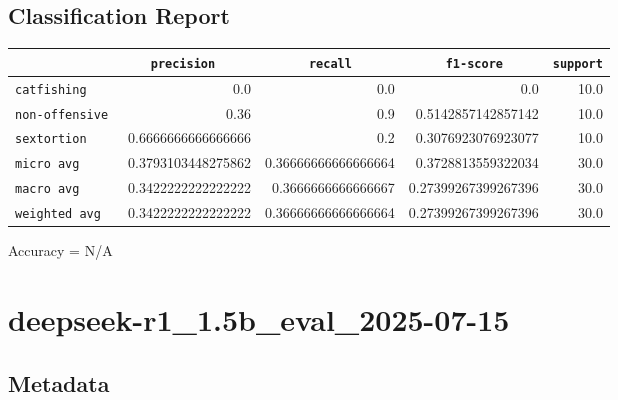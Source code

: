 \documentclass{article}
\begin{document}
\subsection{Classification Report}

\begin{center}
\begin{tabular}{l | r | r | r | r} \hline
    \verb|            | & \verb|    precision     | & \verb|      recall      | & \verb|     f1-score     | & \verb|support| \\ \hline
    \hline
    \verb|catfishing | & 0.0 & 0.0 & 0.0 &    10.0 \\ \hline
    \verb|non-offensive| & 0.36 & 0.9 & 0.5142857142857142 &    10.0 \\ \hline
    \verb|sextortion | & 0.6666666666666666 & 0.2 & 0.3076923076923077 &    10.0 \\ \hline
    \verb|micro avg  | & 0.3793103448275862 & 0.36666666666666664 & 0.3728813559322034 &    30.0 \\ \hline
    \verb|macro avg  | & 0.3422222222222222 & 0.3666666666666667 & 0.27399267399267396 &    30.0 \\ \hline
    \verb|weighted avg| & 0.3422222222222222 & 0.36666666666666664 & 0.27399267399267396 &    30.0 \\ \hline
\end{tabular}
\end{center}

\begin{center}
Accuracy = N/A
\end{center}

\section{deepseek-r1\_1.5b\_eval\_2025-07-15}
\subsection{Metadata}
\end{document}
